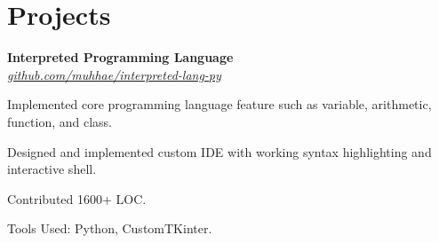 \section{Projects}
    \begin{twocolentry}{
    }
    \textbf{Interpreted Programming Language}\\
    \textit{\href{https://github.com/muhhae/interpreted-lang-py}{github.com/muhhae/interpreted-lang-py}}
    \end{twocolentry}

    \vspace{0.10 cm}
    \begin{onecolentry}
        \begin{highlights}
            \item Implemented core programming language feature such as variable, arithmetic, function,
                and class.
            \item Designed and implemented custom IDE with working syntax highlighting and interactive shell.
            \item Contributed 1600+ LOC.
            \item Tools Used: Python, CustomTKinter.
        \end{highlights}
    \end{onecolentry}

    \vspace{0.2 cm}


